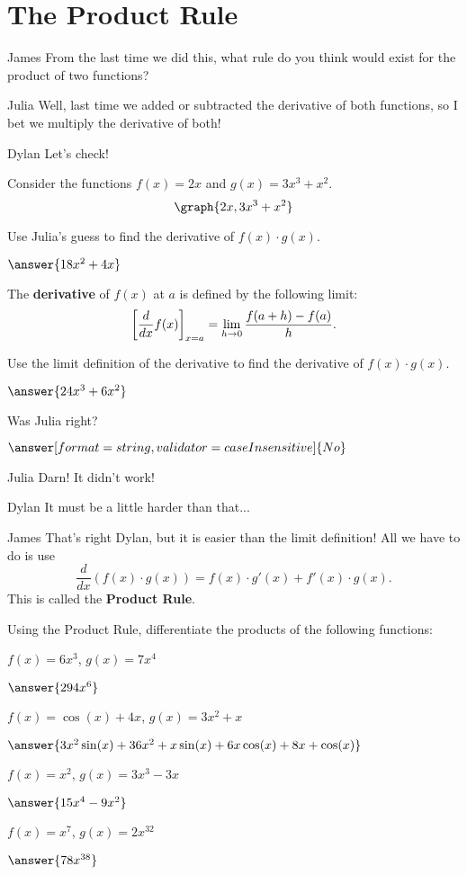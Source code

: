 \documentclass{ximera}
\begin{document}
\section{The Product Rule}
\begin{dialogue}
\item[James] From the last time we did this, what rule do you think would exist for the product of two functions?
\item[Julia] Well, last time we added or subtracted the derivative of both functions, so I bet we multiply the derivative of both!
\item[Dylan] Let's check!
\end{dialogue}
Consider the functions $f(x) = 2x$ and $g(x) = 3x^3 + x^2$.
\[
\graph{2x, 3x^3+x^2}
\]
\begin{question}
Use Julia's guess to find the derivative of $f(x) \cdot g(x)$.

$\answer{18x^2+4x}$

\begin{definition}
  The \textbf{derivative} of $f(x)$ at $a$ is defined by the following limit:
  \[
  \bigg[ \frac{d}{dx} f(x) \bigg]_{x=a} = \lim_{h\to 0} \frac{f(a+h) - f(a)}{h}.
  \]
\end{definition}

Use the limit definition of the derivative to find the derivative of $f(x) \cdot g(x)$.

$\answer{24x^3+6x^2}$

Was Julia right?

$\answer[format=string,validator=caseInsensitive]{No}$
\end{question}
\begin{dialogue}
\item[Julia] Darn! It didn't work!
\item[Dylan] It must be a little harder than that...
\item[James] That's right Dylan, but it is easier than the limit definition! All we have to do is use $$\frac{d}{dx}\left(f(x)\cdot g(x)\right)= f(x)\cdot g'(x) + f'(x)\cdot g(x)\text{.}$$ This is called the \textbf{Product Rule}.
\end{dialogue}
\begin{question}
Using the Product Rule, differentiate the products of the following functions:

$f(x) = 6x^3$, $g(x) = 7x^4$

$\answer{294x^6}$

$f(x) = \cos(x)+4x$, $g(x) = 3x^2+x$

$\answer{3x^2\sin(x)+36x^2+x\sin(x)+6x\cos(x)+8x+\cos(x)}$

$f(x) = x^2$, $g(x) = 3x^3-3x$

$\answer{15x^4-9x^2}$

$f(x) = x^7$, $g(x) = 2x^{32}$

$\answer{78x^{38}}$

\end{question}
\end{document}
